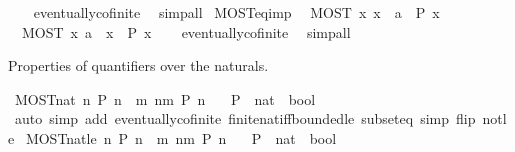 \begin{isabellebody}
%
\isadelimproof
\ \ %
\endisadelimproof
%
\isatagproof
{}\isamarkupfalse%
\ eventually{\isacharunderscore}cofinite\ \isamarkupfalse%
\ simp{\isacharunderscore}all%
\endisatagproof
{\isafoldproof}%
%
\isadelimproof
\isanewline
%
\endisadelimproof
\isanewline
{}\isamarkupfalse%
\ MOST{\isacharunderscore}eq{\isacharunderscore}imp{\isacharcolon}\isanewline
\ \ {\isachardoublequoteopen}MOST\ x{\isachardot}\ x\ {\isacharequal}\ a\ {\isasymlongrightarrow}\ P\ x{\isachardoublequoteclose}\isanewline
\ \ {\isachardoublequoteopen}MOST\ x{\isachardot}\ a\ {\isacharequal}\ x\ {\isasymlongrightarrow}\ P\ x{\isachardoublequoteclose}\isanewline
%
\isadelimproof
\ \ %
\endisadelimproof
%
\isatagproof
{}\isamarkupfalse%
\ eventually{\isacharunderscore}cofinite\ \isamarkupfalse%
\ simp{\isacharunderscore}all%
\endisatagproof
{\isafoldproof}%
%
\isadelimproof
%
\endisadelimproof
%
\begin{isamarkuptext}%
Properties of quantifiers over the naturals.%
\end{isamarkuptext}\isamarkuptrue%
\isamarkupfalse%
\ MOST{\isacharunderscore}nat{\isacharcolon}\ {\isachardoublequoteopen}{\isacharparenleft}{\isasymforall}\isactrlsub {\isasyminfinity}n{\isachardot}\ P\ n{\isacharparenright}\ {\isasymlongleftrightarrow}\ {\isacharparenleft}{\isasymexists}m{\isachardot}\ {\isasymforall}n{\isachargreater}m{\isachardot}\ P\ n{\isacharparenright}{\isachardoublequoteclose}\isanewline
\ \ \ P\ {\isacharcolon}{\isacharcolon}\ {\isachardoublequoteopen}nat\ {\isasymRightarrow}\ bool{\isachardoublequoteclose}\isanewline
%
\isadelimproof
\ \ %
\endisadelimproof
%
\isatagproof
{}\isamarkupfalse%
\ {\isacharparenleft}auto\ simp\ add{\isacharcolon}\ eventually{\isacharunderscore}cofinite\ finite{\isacharunderscore}nat{\isacharunderscore}iff{\isacharunderscore}bounded{\isacharunderscore}le\ subset{\isacharunderscore}eq\ simp\ flip{\isacharcolon}\ not{\isacharunderscore}le{\isacharparenright}%
\endisatagproof
{\isafoldproof}%
%
\isadelimproof
\isanewline
%
\endisadelimproof
\isanewline
{}\isamarkupfalse%
\ MOST{\isacharunderscore}nat{\isacharunderscore}le{\isacharcolon}\ {\isachardoublequoteopen}{\isacharparenleft}{\isasymforall}\isactrlsub {\isasyminfinity}n{\isachardot}\ P\ n{\isacharparenright}\ {\isasymlongleftrightarrow}\ {\isacharparenleft}{\isasymexists}m{\isachardot}\ {\isasymforall}n{\isasymge}m{\isachardot}\ P\ n{\isacharparenright}{\isachardoublequoteclose}\isanewline
\ \ \ P\ {\isacharcolon}{\isacharcolon}\ {\isachardoublequoteopen}nat\ {\isasymRightarrow}\ bool{\isachardoublequoteclose}\isanewline

\end{isabellebody}
